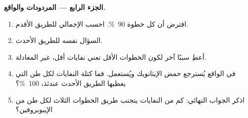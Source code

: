 \begin{problem}
\medskip
\noindent\textbf{الجزء الرابع --- المردودات والواقع.}
\begin{enumerate}[resume]
  \item افترض أن  كل خطوة \qty{90}{\percent}.
        احسب  الإجمالي للطريق الأقدم.
  \item السؤال نفسه للطريق الأحدث.
  \item أعطِ سببًا آخر لكون الخطوات الأقل تعني نفايات أقل، غير
        المعادلة.
  \item في الواقع يُسترجع حمض الإيثانويك ويُستعمل. فما كتلة
        النفايات لكل طن التي يعطيها الطريق الأحدث عندئذ، 
        \qty{100}{\percent}؟
  \item اذكر الجواب النهائي: كم من النفايات يتجنب طريق الخطوات الثلاث
        لكل طن من الإيبوبروفين؟
\end{enumerate}
\end{problem}
